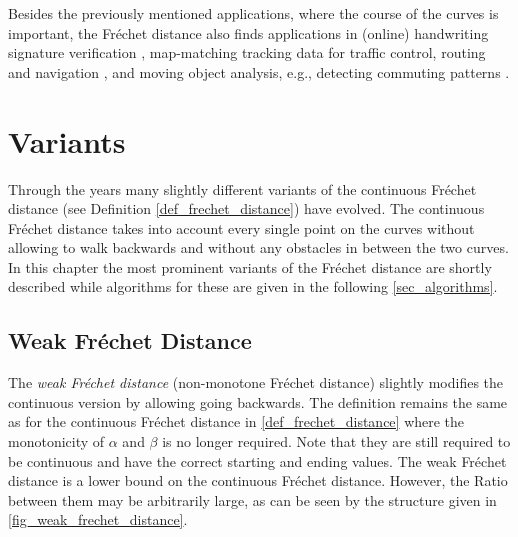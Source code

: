 \documentclass[
oneside,
fontsize=11pt
]{scrartcl}
\begin{document}
Besides the previously mentioned applications, 
where the course of the curves is important, 
the Fréchet distance also finds applications in
(online) handwriting signature verification \cite{zheng_algorithm_2008,fang_research_2018},
map-matching tracking data for traffic control, routing and navigation \cite{wenk_addressing_2006,brakatsoulas_map-matching_2005},
and moving object analysis, e.g., detecting commuting patterns \cite{buchin_detecting_2011}.






\section{Variants}
Through the years many slightly different variants of the continuous Fréchet distance (see Definition \ref{def_frechet_distance}) have evolved. 
The continuous Fréchet distance takes into account every single point on the curves 
without allowing to walk backwards 
and without any obstacles in between the two curves.
In this chapter the most prominent variants of the Fréchet distance are shortly described 
while algorithms for these are given in the following \autoref{sec_algorithms}.

\subsection{Weak Fréchet Distance}
\label{sec_weak_frechet_distance}
The \textit{weak Fréchet distance} (non-monotone Fréchet distance) 
slightly modifies the continuous version by allowing going backwards. 
The definition remains the same as for the continuous Fréchet distance in \autoref{def_frechet_distance}
where the monotonicity of $\alpha$ and $\beta$ is no longer required.
Note that they are still required to be continuous and have the correct starting and ending values.
The weak Fréchet distance is a lower bound on the continuous Fréchet distance.
However, the Ratio between them may be arbitrarily large, 
as can be seen by the structure given in \autoref{fig_weak_frechet_distance}. \cite{alt_computing_1995}
\end{document}
